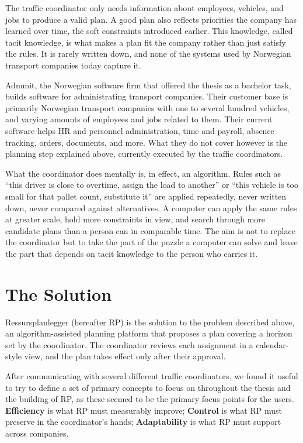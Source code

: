 The traffic coordinator only needs information about employees, vehicles, and jobs to produce a valid plan. A good plan also reflects priorities the company has learned over time, the soft constraints introduced earlier. This knowledge, called tacit knowledge, is what makes a plan fit the company rather than just satisfy the rules. It is rarely written down, and none of the systems used by Norwegian transport companies today capture it.

Admmit, the Norwegian software firm that offered the thesis as a bachelor task, builds software for administrating transport companies. Their customer base is primarily Norwegian transport companies with one to several hundred vehicles, and varying amounts of employees and jobs related to them. Their current software helps HR and personnel administration, time and payroll, absence tracking, orders, documents, and more. What they do not cover however is the planning step explained above, currently executed by the traffic coordinators.

What the coordinator does mentally is, in effect, an algorithm. Rules such as ``this driver is close to overtime, assign the load to another'' or ``this vehicle is too small for that pallet count, substitute it'' are applied repeatedly, never written down, never compared against alternatives. A computer can apply the same rules at greater scale, hold more constraints in view, and search through more candidate plans than a person can in comparable time. The aim is not to replace the coordinator but to take the part of the puzzle a computer can solve and leave the part that depends on tacit knowledge to the person who carries it.


\section{The Solution}
\label{sec:solution}

Ressursplanlegger (hereafter RP) is the solution to the problem described above, an algorithm-assisted planning platform that proposes a plan covering a horizon set by the coordinator. The coordinator reviews each assignment in a calendar-style view, and the plan takes effect only after their approval.

After communicating with several different traffic coordinators, we found it useful to try to define a set of primary concepts to focus on throughout the thesis and the building of RP, as these seemed to be the primary focus points for the users. \textbf{Efficiency} is what RP must measurably improve; \textbf{Control} is what RP must preserve in the coordinator's hands; \textbf{Adaptability} is what RP must support across companies.


